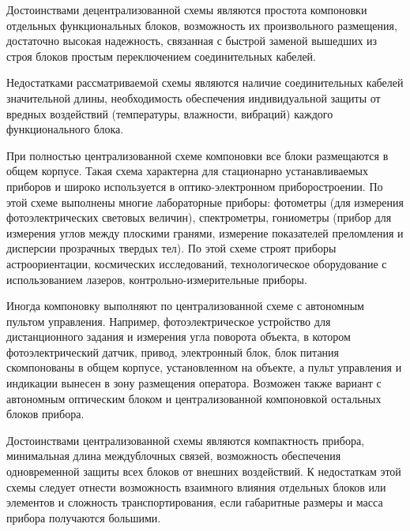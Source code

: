 Достоинствами децентрализованной схемы являются простота компоновки отдельных функциональных блоков, возможность их произвольного размещения, достаточно высокая надежность, связанная с быстрой заменой вышедших из строя блоков простым переключением соединительных кабелей.
 
Недостатками рассматриваемой схемы являются наличие соединительных кабелей значительной длины, необходимость обеспечения индивидуальной защиты от вредных воздействий (температуры, влажности, вибраций) каждого функционального блока.

При полностью централизованной схеме компоновки все блоки размещаются в общем корпусе. Такая схема характерна для стационарно устанавливаемых приборов и широко используется в оптико-электронном приборостроении. По этой схеме выполнены многие лабораторные приборы: фотометры (для измерения фотоэлектрических световых величин), спектрометры, гониометры (прибор для измерения углов между плоскими гранями, измерение показателей преломления и дисперсии прозрачных твердых тел). По этой схеме строят приборы астроориентации, космических исследований, технологическое оборудование с использованием лазеров, контрольно-измерительные приборы.

Иногда компоновку выполняют по централизованной схеме с автономным пультом управления. Например, фотоэлектрическое устройство для дистанционного задания и измерения угла поворота объекта, в котором фотоэлектрический датчик, привод, электронный блок, блок питания скомпонованы в общем корпусе, установленном на объекте, а пульт управления и индикации вынесен в зону размещения оператора. Возможен также вариант с автономным оптическим блоком и централизованной компоновкой остальных блоков прибора.

Достоинствами централизованной схемы являются компактность прибора, минимальная длина междублочных связей, возможность обеспечения одновременной защиты всех блоков от внешних воздействий. 
К недостаткам этой схемы следует отнести возможность взаимного влияния отдельных блоков или элементов и сложность транспортирования, если габаритные размеры и масса прибора получаются большими.

